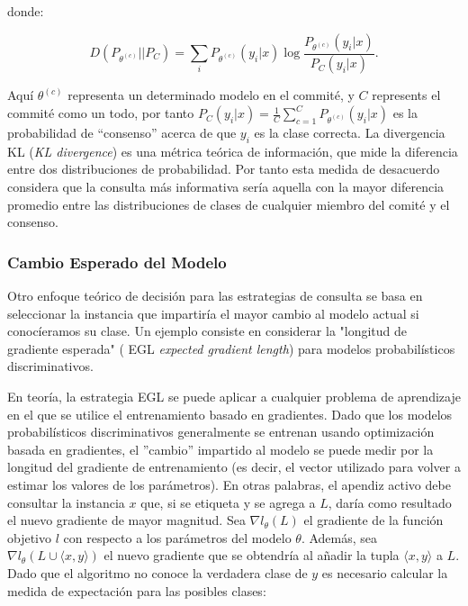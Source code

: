 donde:

\begin{equation}
D(P_{\theta^{(c)}}|| P_C) = \sum_i {P_{\theta^{(c)}}(y_i | x) \log{\frac{P_{\theta^{(c)}}(y_i | x)}{P_C(y_i | x)}}}.
\end{equation}

Aquí $\theta^{(c)}$ representa un determinado modelo en el commité, y $C$ represents el commité como un todo, por tanto $P_C(y_i | x) = \frac{1}{C} \sum_{c = 1}^{C} P_{\theta^{(c)}}(y_i | x)$ es la probabilidad de “consenso” acerca de que $y_i$ es la clase correcta. La divergencia KL (\textit{KL divergence}) \cite{kullback1951oninfo} es una métrica teórica de información, que mide la diferencia entre dos distribuciones de probabilidad. Por tanto esta medida de desacuerdo considera que la consulta más informativa sería aquella con la mayor diferencia promedio entre las distribuciones de clases de cualquier miembro del comité y el consenso. \cite{settles2009survey}

\subsubsection{Cambio Esperado del Modelo}

Otro enfoque teórico de decisión para las estrategias de consulta se basa en seleccionar la instancia que impartiría el mayor cambio al modelo actual si conocíeramos su clase. Un ejemplo consiste en considerar la "longitud de gradiente esperada" ( EGL \textit{expected gradient length}) para modelos probabilísticos discriminativos.

En teoría, la estrategia EGL se puede aplicar a cualquier problema de aprendizaje en el que se utilice el entrenamiento basado en gradientes. Dado que los modelos probabilísticos discriminativos generalmente se entrenan usando optimización basada en gradientes, el ''cambio'' impartido al modelo se puede medir por la longitud del gradiente de entrenamiento (es decir, el vector utilizado para volver a estimar los valores de los parámetros). En otras palabras, el apendiz activo debe consultar la instancia $x$ que, si se etiqueta y se agrega a $L$, daría como resultado el nuevo gradiente de mayor magnitud. Sea $\nabla l_{\theta}(L) $   el gradiente de la función objetivo $l$ con respecto a los parámetros del modelo $\theta$.  Además, sea $ \nabla l_{\theta}(L \cup \langle x,y \rangle )$ el nuevo gradiente que se obtendría al añadir la tupla $\langle x,y \rangle$ a $L$. Dado que el algoritmo no conoce la verdadera clase de $y$ es necesario calcular la medida de expectación para las posibles clases:

